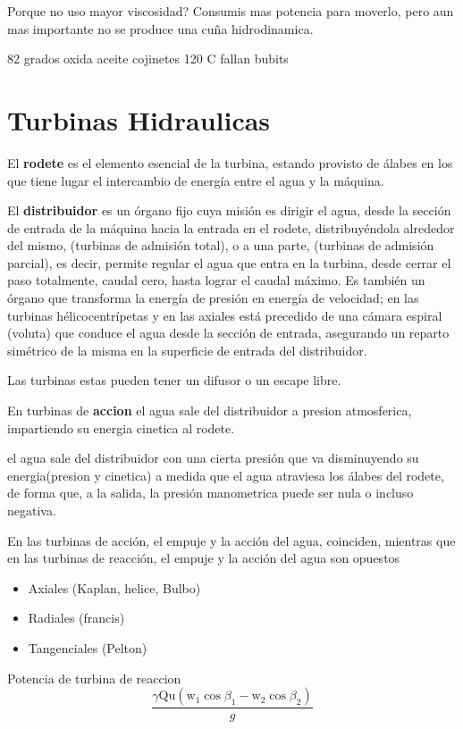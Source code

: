 \documentclass{article}
\begin{document}
Porque no uso mayor viscosidad? Consumis mas potencia para moverlo, pero aun mas importante no se produce una cuña hidrodinamica.

82 grados oxida aceite cojinetes
120 C fallan bubits

\section{Turbinas Hidraulicas}

El \textbf{rodete} es el elemento esencial de la turbina, estando provisto de álabes en los que tiene lugar
el intercambio de energía entre el agua y la máquina.

El \textbf{distribuidor} es un órgano fijo cuya misión es dirigir el agua, desde la sección de entrada de la
máquina hacia la entrada en el rodete, distribuyéndola alrededor del mismo, (turbinas de admisión
total), o a una parte, (turbinas de admisión parcial), es decir, permite regular el agua que entra en
la turbina, desde cerrar el paso totalmente, caudal cero, hasta lograr el caudal máximo. Es también
un órgano que transforma la energía de presión en energía de velocidad; en las turbinas
hélicocentrípetas y en las axiales está precedido de una cámara espiral (voluta) que conduce el agua
desde la sección de entrada, asegurando un reparto simétrico de la misma en la superficie de
entrada del distribuidor.

Las turbinas estas pueden tener un difusor o un escape libre.

En turbinas de \textbf{accion} el agua sale del distribuidor a presion atmosferica, impartiendo su energia cinetica al rodete.

el agua sale del distribuidor con
una cierta presión que va
disminuyendo su energia(presion y cinetica) a medida que el
agua atraviesa los álabes del
rodete, de forma que, a la salida, la
presión manometrica puede ser
nula o incluso negativa.

En las turbinas de acción, el empuje y la
acción del agua, coinciden, mientras que en
las turbinas de reacción, el empuje y la acción
del agua son opuestos

\begin{itemize}
    \item Axiales (Kaplan, helice, Bulbo)
    \item Radiales (francis)
    \item Tangenciales (Pelton)
    
\end{itemize}
Potencia de turbina de reaccion
\[
\frac{\gamma \mathrm{Q} \mathrm{u}\left(\mathrm{w}_{1} \cos \beta_{1}-\mathrm{w}_{2} \cos \beta_{2}\right)}{g}
\]
\end{document}
